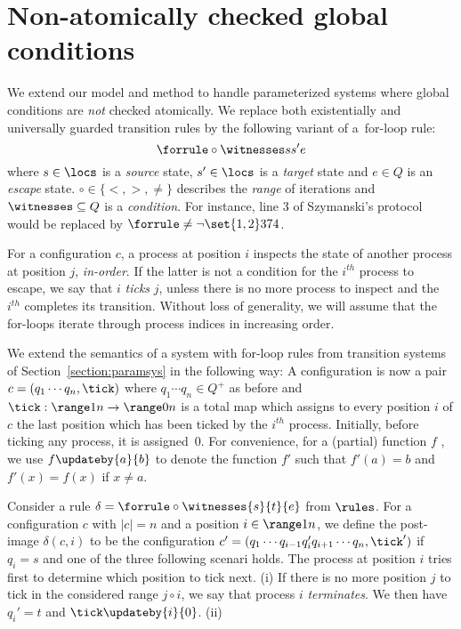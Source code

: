 %
\section{Non-atomically checked global conditions}
\label{section:non-atomic}
We extend our model and method to handle parameterized systems where
global conditions are \emph{not} checked atomically.
%
We replace both existentially and universally guarded transition rules
by the following variant of a~for-loop rule:
$$%
\forrule \circ \witnesses s {s'} e%
$$
where $s\in\locs$ is a \emph{source} state, $s'\in\locs$ is a
\emph{target} state and $e\in Q$ is an \emph{escape}
state. $\circ\in\{<,>,\neq\}$ describes the \emph{range} of iterations
and $\witnesses\subseteq Q$ is a \emph{condition}.
%
For instance, line 3 of Szymanski's protocol would be replaced by
\mbox{$\forrule \neq {\neg\set{1,2}} 3 7 4$}. 

For a configuration $c$, a process at position $i$ inspects the state
of another process at position $j$, \emph{in-order}.
%
If the latter is not a condition for the $i^{th}$ process to escape,
we say that $i$ \emph{ticks} $j$, unless there is no more process to
inspect and the $i^{th}$ completes its transition.
%
Without loss of generality, we will assume that the for-loops iterate
through process indices in increasing order.

%
We extend the semantics of a system with for-loop rules from
transition systems of Section~\ref{section:paramsys} in the following
way: %
A configuration is now a pair $c = (q_1\cdots q_n,\tick)$ where
$q_1\cdots q_n\in Q^+$ as before and $\tick:\range 1 n \rightarrow
\range 0 n$ is a total map which assigns to every position $i$ of $c$
the last position which has been ticked by the $i^{th}$ process. %
Initially, before ticking any process, it is assigned~$0$.
%
For convenience, for a (partial) function $f$ , we use
$f\updateby{a}{b}$ to denote the function $f'$ such that $f'(a)=b$ and
$f'(x)=f(x)$ if $x\neq a$.


Consider a rule $\delta = \forrule \circ \witnesses {s} {t} {e}$ from
$\rules$. %
For a configuration $c$ with $|c| = n$ and a position $i\in\range 1
{n}$, we define the post-image $\delta(c,i)$ to be the configuration
$c'=(q_1\cdots q_{i-1}q_i'q_{i+1}\cdots q_n,\tick')$ if $q_i = s$ and
one of the three following scenari holds.
%
The process at position $i$ tries first to determine which position to
tick next.
%
(i) If there is no more position $j$ to tick in the considered range
$j\circ i$, we say that process $i$ \emph{terminates}. %
We then have $q_i'= t$ and $\tick\updateby{i}{0}$.
(ii) 

